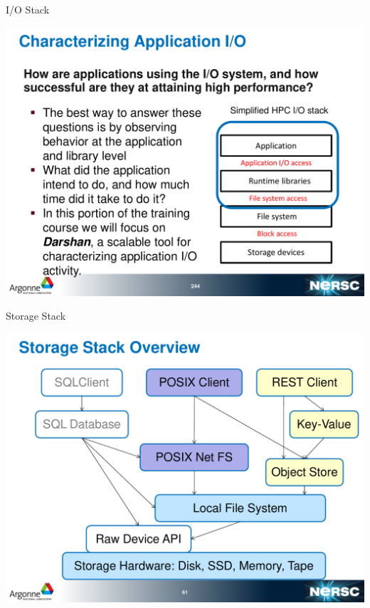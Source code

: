 \documentclass[compress,11pt,xcolor=svgnames,aspectratio=169]{beamer}
\begin{document}
\begin{frame}[t]{I/O Stack}

\begin{center}
\includegraphics[scale=0.3]{fig/io-stack3}
\end{center}


\end{frame}

\begin{frame}[t]{Storage Stack}

\begin{center}
\includegraphics[scale=0.3]{fig/storage-stack}
\end{center}


\end{frame}
\end{document}
